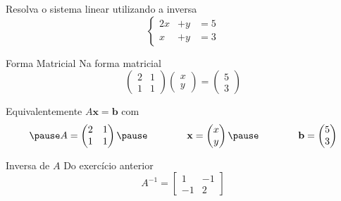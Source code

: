 \begin{question}
  Resolva o sistema linear utilizando a inversa
  \[
    \left\{\begin{array}{rrr}
      2x & + y  & = 5 \\
       x & + y  & = 3
    \end{array}\right.
  \]
\end{question}

\begin{resolution}{Forma Matricial}
  Na forma matricial
  \[
    \begin{pmatrix}
      2 & 1 \\
      1 & 1
    \end{pmatrix}
    \begin{pmatrix} x \\ y \end{pmatrix} =
    \begin{pmatrix} 5 \\ 3 \end{pmatrix}
  \]

  \pause
  Equivalentemente \(A \mathbf{x} = \mathbf{b}\) com
  \[
    \pause
    A =
    \begin{pmatrix}
      2 & 1 \\
      1 & 1
    \end{pmatrix}
    \pause
    \qquad\qquad
    \mathbf{x} = \begin{pmatrix} x \\ y \end{pmatrix}
    \pause
    \qquad\qquad
    \mathbf{b} =  \begin{pmatrix} 5 \\ 3 \end{pmatrix}
  \]
\end{resolution}

\begin{resolution}{Inversa de $A$}
  Do exercício anterior
  \pause
  \[
    A^{-1} =
    \begin{bmatrix}
      1  & -1 \\
      -1 & 2
    \end{bmatrix}
  \]
\end{resolution}


